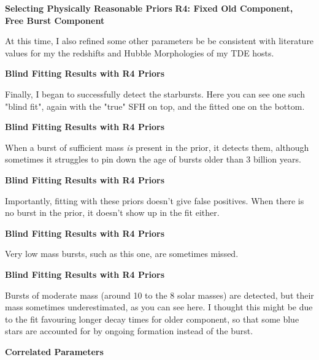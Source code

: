 \documentclass[a4paper,11pt]{article}
\begin{document}
\noindent \newline \textbf{Selecting Physically Reasonable Priors}
\noindent \newline \textbf{R4: Fixed Old Component, Free Burst Component}

\noindent \newline At this time, I also refined some other parameters be be consistent with
literature values for my the redshifts and Hubble Morphologies of my TDE hosts.

\noindent \newline \textbf{Blind Fitting Results with R4 Priors}

\noindent \newline Finally, I began to successfully detect the starbursts. Here you can see one
such "blind fit", again with the "true" SFH on top, and the fitted one on the
bottom.

\noindent \newline \textbf{Blind Fitting Results with R4 Priors}

\noindent \newline When a burst of sufficient mass \textit{is} present in the prior, it detects
them, although sometimes it struggles to pin down the age of bursts older than
3 billion years.

\noindent \newline \textbf{Blind Fitting Results with R4 Priors}

\noindent \newline Importantly, fitting with these priors doesn't give false positives. When there
is no burst in the prior, it doesn't show up in the fit either.

\noindent \newline \textbf{Blind Fitting Results with R4 Priors}

\noindent \newline Very low mass bursts, such as this one, are sometimes missed.

\noindent \newline \textbf{Blind Fitting Results with R4 Priors}

\noindent \newline Bursts of moderate mass (around 10 to the 8 solar masses) are detected, but their mass
sometimes underestimated, as you can see here. I thought this might be due to the
fit favouring longer decay times for older component, so that some blue stars
are accounted for by ongoing formation instead of the burst.

\noindent \newline \textbf{Correlated Parameters}
\end{document}
